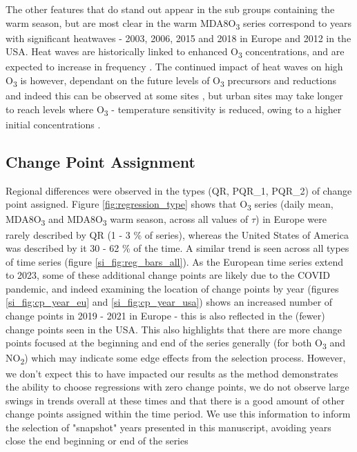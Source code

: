 \documentclass[journal abbreviation, manuscript]{copernicus}
\begin{document}
The other features that do stand out appear in the sub groups containing the warm season, but are most clear in the warm MDA8O\textsubscript{3} series correspond to years with significant heatwaves - 2003, 2006, 2015 and 2018 in Europe and 2012 in the USA. Heat waves are historically linked to enhanced O\textsubscript{3} concentrations, and are expected to increase in frequency \citep{Schär2004, Russo_2015, https://doi.org/10.1002/2016GL068432, Otero_2016, GOULDSBROUGH2022118975}. The continued impact of heat waves on high O\textsubscript{3} is however, dependant on the future levels of O\textsubscript{3} precursors and reductions and indeed this can be observed at some sites \citep{Meehl_2018, OTERO2021118334, acp-25-2725-2025, acp-25-5101-2025}, but urban sites may take longer to reach levels where O\textsubscript{3} - temperature sensitivity is reduced, owing to a higher initial concentrations \citep{VazquezSantiago2024}.


\subsection{Change Point Assignment} \label{sect:new_mda8_piecewise_types}

Regional differences were observed in the types (QR, PQR\_1, PQR\_2) of change point assigned. Figure \ref{fig:regression_type} shows that O\textsubscript{3} series (daily mean, MDA8O\textsubscript{3} and MDA8O\textsubscript{3} warm season, across all values of $\tau$) in Europe were rarely described by QR (1 - 3 \% of series), whereas the United States of America was described by it 30 - 62 \% of the time. A similar trend is seen across all types of time series (figure \ref{si_fig:reg_bars_all}). As the European time series extend to 2023, some of these additional change points are likely due to the COVID pandemic, and indeed examining the location of change points by year (figures \ref{si_fig:cp_year_eu} and \ref{si_fig:cp_year_usa}) shows an increased number of change points in 2019 - 2021 in Europe - this is also reflected in the (fewer) change points seen in the USA. This also highlights that there are more change points focused at the beginning and end of the series generally (for both O\textsubscript{3} and NO\textsubscript{2}) which may indicate some edge effects from the selection process. However, we don't expect this to have impacted our results as the method demonstrates the ability to choose regressions with zero change points, we do not observe large swings in trends overall at these times and that there is a good amount of other change points assigned within the time period. We use this information to inform the selection of "snapshot" years presented in this manuscript, avoiding years close the end beginning or end of the series
 
\end{document}
